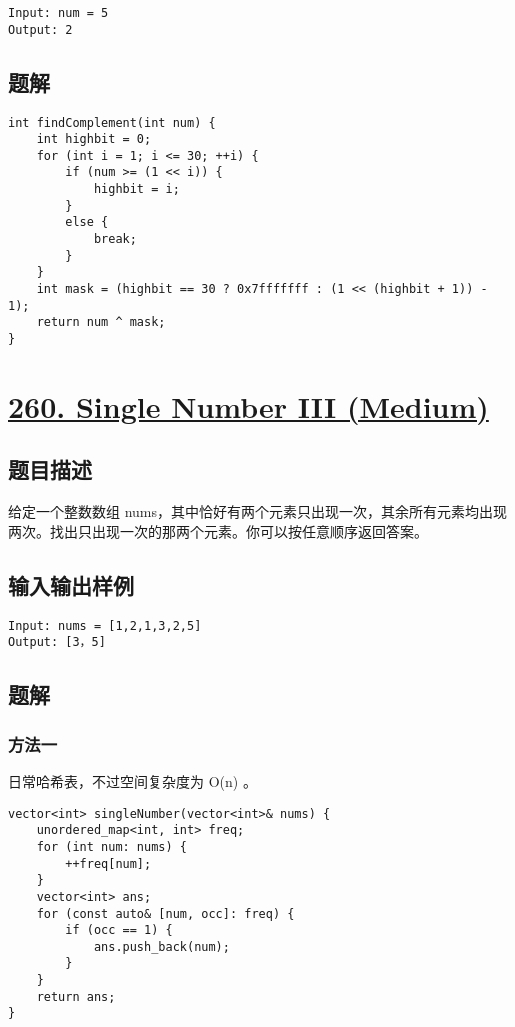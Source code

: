 \documentclass[lang=cn,10pt]{elegantbook}
\begin{document}
\begin{lstlisting}
Input: num = 5
Output: 2
\end{lstlisting}

\subsection*{题解}

\begin{lstlisting}
int findComplement(int num) {
	int highbit = 0;
	for (int i = 1; i <= 30; ++i) {
		if (num >= (1 << i)) {
			highbit = i;
		}
		else {
			break;
		}            
	}
	int mask = (highbit == 30 ? 0x7fffffff : (1 << (highbit + 1)) - 1);
	return num ^ mask;
}
\end{lstlisting}

{\color{red}\section{\href{https://leetcode.cn/problems/single-number-iii/}{260. Single Number III (Medium)}}} \label{ch10.260}

\subsection*{题目描述}

给定一个整数数组 nums，其中恰好有两个元素只出现一次，其余所有元素均出现两次。找出只出现一次的那两个元素。你可以按任意顺序返回答案。

\subsection*{输入输出样例}

\begin{lstlisting}
Input: nums = [1,2,1,3,2,5]
Output: [3，5]
\end{lstlisting}

\subsection*{题解}

\subsubsection*{方法一}

日常哈希表，不过空间复杂度为 O(n) 。

\begin{lstlisting}
vector<int> singleNumber(vector<int>& nums) {
	unordered_map<int, int> freq;
	for (int num: nums) {
		++freq[num];
	}
	vector<int> ans;
	for (const auto& [num, occ]: freq) {
		if (occ == 1) {
			ans.push_back(num);
		}
	}
	return ans;
}
\end{lstlisting}
\end{document}
